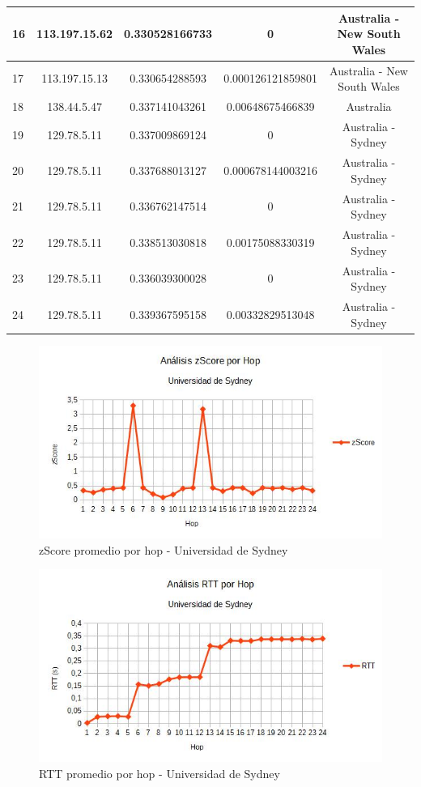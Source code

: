 \begin{tabular}{ | l | c | c | c | c |}
  16  &  113.197.15.62  &  0.330528166733  &  0 & Australia - New South Wales\\
  \hline
  17  &  113.197.15.13  &  0.330654288593  &  0.000126121859801 & Australia - New South Wales\\
  \hline
  18  &  138.44.5.47  &  0.337141043261  &  0.00648675466839 & Australia\\
  \hline
  19  &  129.78.5.11  &  0.337009869124  &  0 & Australia - Sydney\\
  \hline
  20  &  129.78.5.11  &  0.337688013127  &  0.000678144003216 & Australia - Sydney\\
  \hline
  21  &  129.78.5.11  &  0.336762147514  &  0 & Australia - Sydney\\
  \hline
  22  &  129.78.5.11  &  0.338513030818  &  0.00175088330319 & Australia - Sydney\\
  \hline
  23  &  129.78.5.11  &  0.336039300028  &  0 & Australia - Sydney\\
  \hline
  24  &  129.78.5.11  &  0.339367595158  &  0.00332829513048 & Australia - Sydney\\
  \hline

\end{tabular}

\bigskip

\begin{figure}[H]
\centering
\includegraphics[width=1\textwidth]{graficos/zScore_Australia.jpg}
\caption{zScore promedio por hop - Universidad de Sydney}
\label{Australia_zs}
\end{figure}

\begin{figure}[H]
\centering
\includegraphics[width=1\textwidth]{graficos/rTT_Australia.jpg}
\caption{RTT promedio por hop - Universidad de Sydney}
\label{Australia_rtt}
\end{figure}